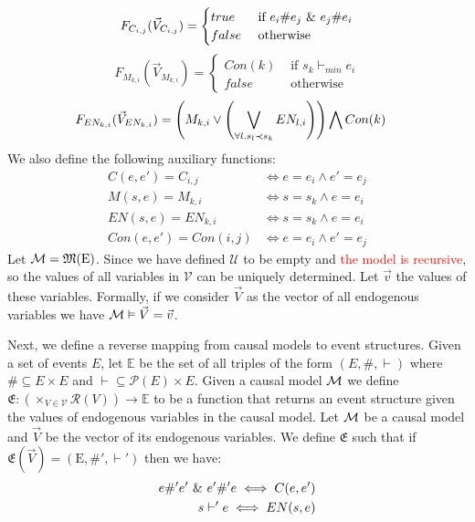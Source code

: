 $$
    F_{C_{i,j}}(\vec V_{C_{i,j}}) = \begin{cases}
        true  & \text{ if } e_i \# e_j \ \& \  e_j \# e_i \\
        false & \text{ otherwise }
    \end{cases}
$$
$$
    F_{M_{k,i}}(\vec V_{M_{k,i}}) = \begin{cases}
        Con(k) & \text{ if } s_k \vdash_{min} e_i \\
        false  & \text{ otherwise }
    \end{cases}
$$
\begin{align*}
    F_{EN_{k,i}}(\vec V_{EN_{k,i}}) & =
    \left(
    M_{k,i} \vee
    \left(
    \bigvee_{\forall l. s_l  \prec s_k}EN_{l,i}
    \right)
    \right)
    \bigwedge
    Con(k)
\end{align*}
We also define the following auxiliary functions:
\begin{align*}
    C(e,e') = C_{i,j}    & \iff e = e_i \wedge e' = e_j \\
    M(s,e)  = M_{k,i}    & \iff s = s_k \wedge e = e_i  \\
    EN(s,e)  = EN_{k,i}  & \iff s = s_k \wedge e = e_i  \\
    Con(e,e') = Con(i,j) & \iff e = e_i \wedge e' = e_j
\end{align*}
Let $\mathcal{M} = \mathfrak{M}(\mathrm{E})$.
Since we have defined $\mathcal{U}$ to be empty and
\textcolor{red}{the model is recursive}, so the values of all variables in
$\mathcal{V}$ can be uniquely determined.
Let $\vec v$ the values of these variables.
Formally, if we consider $\vec V$ as the vector of all endogenous variables
we have $\mathcal{M} \vDash \vec V = \vec v$.

Next, we define a reverse mapping from causal models to event structures.
Given a set of events $E$, let $\mathbb{E}$ be the set of all
triples of the form $(E,\#,\vdash)$ where $\# \subseteq E \times E$ 
and $\vdash \subseteq \mathcal{P}(E) \times E$.
Given a causal model $\mathcal{M}$ we define
$\mathfrak{E}: (\times_{V \in \mathcal{V}}\mathcal{R}(V)) \rightarrow \mathbb{E}$
to be a function that returns an event structure given the values
of endogenous variables in the causal model.
Let $\mathcal{M}$ be a causal model and $\vec V$ be the vector of its
endogenous variables.
We define $\mathfrak{E}$ such that if
$\mathfrak{E}(\vec V) = (\mathrm{E},\#',\vdash')$ then we have:
\begin{align*}
    e \#' e' \ \& \  e' \#' e \iff C(e,e') \\
    s \vdash' e \iff EN(s,e)
\end{align*}

